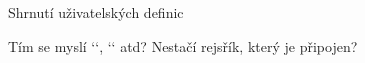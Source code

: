 %
%
%
%
%
%
%
%
%
%
%
%
%
%
%
%
%
\sec[suma] Shrnutí uživatelských definic


Tím se myslí `\amark`, `\tmark` atd? Nestačí rejsřík, který je připojen?


